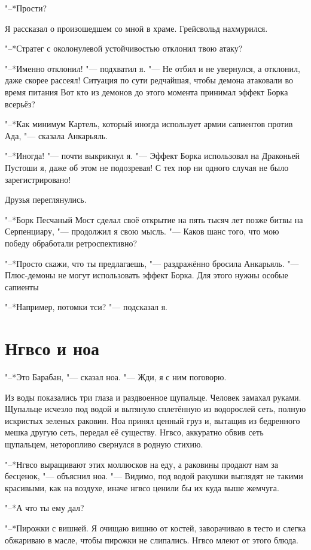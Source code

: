 \documentclass[a4paper,10pt,fleqn]{book}
\newcommand{\ldotst}{\so{...}\xspace}
\begin{document}
"--*Прости?

Я рассказал о произошедшем со мной в храме.
Грейсвольд нахмурился.

"--*Стратег с околонулевой устойчивостью отклонил твою атаку?

"--*Именно отклонил! "--- подхватил я.
"--- Не отбил и не увернулся, а отклонил, даже скорее рассеял!
Ситуация по сути редчайшая, чтобы демона атаковали во время питания\ldotst
Вот кто из демонов до этого момента принимал эффект Борка всерьёз?

"--*Как минимум Картель, который иногда использует армии сапиентов против Ада, "--- сказала Анкарьяль.

"--*Иногда! "--- почти выкрикнул я.
"--- Эффект Борка использовал на Драконьей Пустоши я, даже об этом не подозревая!
С тех пор ни одного случая не было зарегистрировано!

Друзья переглянулись.

"--*Борк Песчаный Мост сделал своё открытие на пять тысяч лет позже битвы на Серпенциару, "--- продолжил я свою мысль.
"--- Каков шанс того, что мою победу обработали ретроспективно?

"--*Просто скажи, что ты предлагаешь, "--- раздражённо бросила Анкарьяль.
"--- Плюс-демоны не могут использовать эффект Борка.
Для этого нужны особые сапиенты\ldotst

"--*Например, потомки тси? "--- подсказал я.

\section{Нгвсо и ноа}

"--*Это Барабан, "--- сказал ноа.
"--- Жди, я с ним поговорю.

Из воды показались три глаза и раздвоенное щупальце.
Человек замахал руками.
Щупальце исчезло под водой и вытянуло сплетённую из водорослей сеть, полную искристых зеленых раковин.
Ноа принял ценный груз и, вытащив из бедренного мешка другую сеть, передал её существу.
Нгвсо, аккуратно обвив сеть щупальцем, неторопливо свернулся в родную стихию.

"--*Нгвсо выращивают этих моллюсков на еду, а раковины продают нам за бесценок, "--- объяснил ноа.
"--- Видимо, под водой ракушки выглядят не такими красивыми, как на воздухе, иначе нгвсо ценили бы их куда выше жемчуга.

"--*А что ты ему дал?

"--*Пирожки с вишней.
Я очищаю вишню от костей, заворачиваю в тесто и слегка обжариваю в масле, чтобы пирожки не слипались.
Нгвсо млеют от этого блюда.
\end{document}
